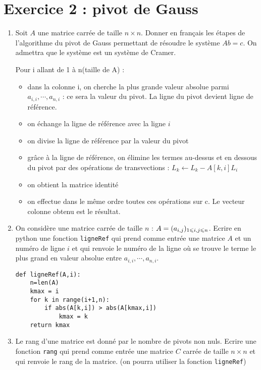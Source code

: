 \documentclass[a4paper,12pt]{article}
\begin{document}
\section*{Exercice 2 : pivot de Gauss}
\begin{enumerate}
\item Soit $A$ une matrice carrée de taille $n\times n$. Donner en français les étapes de l'algorithme du pivot de Gauss permettant de résoudre le système $Ab=c$. On admettra que le système est un système de Cramer.
\begin{solution}
Pour i allant de 1 à n(taille de A) :
\begin{itemize}
\item dans la colonne i, on cherche la plus grande valeur absolue parmi $a_{i,i},\cdots,a_{n,i}$ : ce sera la valeur du pivot. La ligne du pivot devient ligne de référence.
\item  on échange la ligne de référence avec la ligne $i$
\item on divise la ligne de référence par la valeur du pivot
\item grâce à la ligne de référence, on élimine les termes au-dessus et en dessous du pivot par des opérations de transvections : $L_k\longleftarrow L_k-A[k,i]L_i$
\item on obtient la matrice identité
\item on effectue dans le même ordre toutes ces opérations sur c. Le vecteur colonne obtenu est le résultat.
\end{itemize}
\end{solution}
\item On considère une matrice carrée de taille $n$ : $A=(a_{i,j})_{1\leqslant i,j\leqslant n}$. Ecrire en python une fonction \verb?ligneRef? qui prend comme entrée une matrice $A$ et un numéro de ligne $i$ et qui renvoie le numéro de la ligne où se trouve le terme le plus grand en valeur absolue entre $a_{i,i},\cdots,a_{n,i}$.
\begin{solution}
\begin{verbatim}
def ligneRef(A,i):
    n=len(A)
    kmax = i
    for k in range(i+1,n):
        if abs(A[k,i]) > abs(A[kmax,i])
            kmax = k
    return kmax
\end{verbatim}
\end{solution}
\item Le rang d'une matrice est donné par le nombre de pivots non nuls. Ecrire une fonction \verb?rang? qui prend comme entrée une matrice $C$ carrée de taille $n\times n$ et qui renvoie le rang de la matrice. (on pourra utiliser la fonction \verb?ligneRef?)

\end{enumerate}
\end{document}
